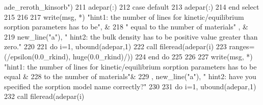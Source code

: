 \begin{DoxyCode}
{{{{{{{{      ade\_reroth\_kinsorb\textcolor{stringliteral}{")}
211 \textcolor{stringliteral}{}\textcolor{stringliteral}{            adepar(:)%
212 \textcolor{stringliteral}{}\textcolor{stringliteral}{          case default}
213 \textcolor{stringliteral}{}\textcolor{stringliteral}{            adepar(:)%
214 \textcolor{stringliteral}{}\textcolor{stringliteral}{        end select}
215 \textcolor{stringliteral}{}\textcolor{stringliteral}{ }
216 \textcolor{stringliteral}{}\textcolor{stringliteral}{      }
217 \textcolor{stringliteral}{}\textcolor{stringliteral}{      write(msg, *) "}hint1: the number of lines for kinetic/equilibrium sorption\textcolor{comment}{ parameters has to be}\textcolor{stringliteral}{", &}
218 \textcolor{stringliteral}{}\textcolor{stringliteral}{      "} equal to the number of materials\textcolor{stringliteral}{" , &}
219 \textcolor{stringliteral}{}\textcolor{stringliteral}{      new\_line("}a\textcolor{stringliteral}{"), "}   hint2: the bulk density has to be positive \textcolor{keywordtype}{value}\textcolor{comment}{ greater than zero.}\textcolor{stringliteral}{"}
220 \textcolor{stringliteral}{}\textcolor{stringliteral}{      }
221 \textcolor{stringliteral}{}\textcolor{stringliteral}{      do i=1, ubound(adepar,1)}
222 \textcolor{stringliteral}{}\textcolor{stringliteral}{         call fileread(adepar(i)%
223 \textcolor{stringliteral}{}\textcolor{stringliteral}{         ranges=(/epsilon(0.0\_rkind), huge(0.0\_rkind)/))}
224 \textcolor{stringliteral}{}\textcolor{stringliteral}{      end do}
225 \textcolor{stringliteral}{}\textcolor{stringliteral}{      }
226 \textcolor{stringliteral}{}\textcolor{stringliteral}{      }
227 \textcolor{stringliteral}{}\textcolor{stringliteral}{      write(msg, *) "}hint1: the number of lines for kinetic/equilibrium sorption\textcolor{comment}{ parameters has to be equal
       &}
228 \textcolor{comment}{        to the number of materials}\textcolor{stringliteral}{"&}
229 \textcolor{stringliteral}{}\textcolor{stringliteral}{       , new\_line("}a\textcolor{stringliteral}{"), "}   hint2: have you specified the sorption model\textcolor{comment}{ name correctly?}\textcolor{stringliteral}{"}
230 \textcolor{stringliteral}{}\textcolor{stringliteral}{      }
231 \textcolor{stringliteral}{}\textcolor{stringliteral}{      do i=1, ubound(adepar,1)}
232 \textcolor{stringliteral}{}\textcolor{stringliteral}{         call fileread(adepar(i)%
}}}}}}}}}}}}
\end{DoxyCode}
